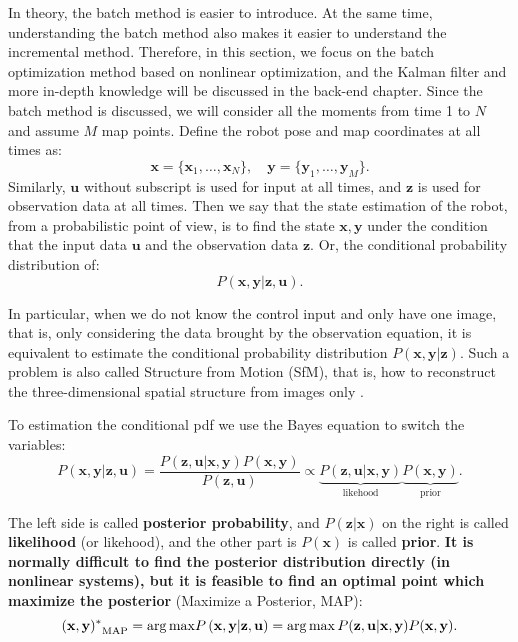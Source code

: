 In theory, the batch method is easier to introduce. At the same time, understanding the batch method also makes it easier to understand the incremental method. Therefore, in this section, we focus on the batch optimization method based on nonlinear optimization, and the Kalman filter and more in-depth knowledge will be discussed in the back-end chapter. Since the batch method is discussed, we will consider all the moments from time 1 to $N$ and assume $M$ map points. Define the robot pose and map coordinates at all times as:
\[
\mathbf{x}=\{ \mathbf{x}_1, \ldots, \mathbf{x}_N \}, \quad \mathbf{y} = \{\mathbf{y}_1, \ldots, \mathbf{y}_M \}.
\]
Similarly, $ \mathbf {u} $ without subscript is used for input at all times, and $ \mathbf {z} $ is used for observation data at all times. Then we say that the state estimation of the robot, from a probabilistic point of view, is to find the state $ \mathbf {x}, \mathbf{y}$ under the condition that the input data $ \mathbf {u} $ and the observation data $\mathbf{z} $. Or, the conditional probability distribution of:
\begin{equation}
P( \mathbf{x},\mathbf{y} | \mathbf{z}, \mathbf{u}).
\end{equation}


In particular, when we do not know the control input and only have one image, that is, only considering the data brought by the observation equation, it is equivalent to estimate  the conditional probability distribution $ P (\mathbf {x}, \mathbf {y} | \mathbf { z}) $. Such a problem is also called Structure from Motion (SfM), that is, how to reconstruct the three-dimensional spatial structure from images only \textsuperscript {\cite {Agarwal2009}}.

To estimation the conditional pdf we use the Bayes equation to switch the variables:
\begin{equation}
P\left( { \mathbf{x},\mathbf{y}| \mathbf{z}, \mathbf{u}} \right) = \frac{{P\left( {\mathbf{z},\mathbf{u}|\mathbf{x},\mathbf{y}} \right)P\left( \mathbf{x}, \mathbf{y} \right)}}{{P\left( \mathbf{z},\mathbf{u}\right)}} \propto \underbrace{P\left(  { \mathbf{z},\mathbf{u}| \mathbf{x},\mathbf{y} } \right)}_{\text{likehood}} \underbrace{P\left( \mathbf{x},\mathbf{y} \right)}_{\text{prior}}.
\end{equation}

The left side is called \textbf {posterior probability}, and $ P (\mathbf {z} | \mathbf {x}) $ on the right is called \textbf {likelihood} (or likehood), and the other part is $ P (\mathbf {x}) $ is called \textbf {prior}. \textbf {It is normally difficult to find the posterior distribution directly (in nonlinear systems), but it is feasible to find an optimal point which maximize the posterior} (Maximize a Posterior, MAP):
\begin{equation}
{(\mathbf{x},\mathbf{y})^*}_{\mathrm{MAP}} = \arg {\mathop{\rm max}\nolimits} P \left( {\mathbf{x},\mathbf{y}|\mathbf{z},\mathbf{u}} \right) = \arg \max P(\mathbf{z},\mathbf{u}|\mathbf{x},\mathbf{y})P(\mathbf{x},\mathbf{y}).
\end{equation}


